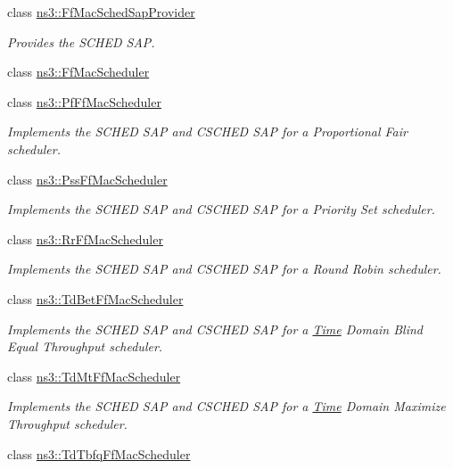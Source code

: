 \begin{DoxyCompactItemize}
class \hyperlink{classns3_1_1FfMacSchedSapProvider}{ns3\+::\+Ff\+Mac\+Sched\+Sap\+Provider}
\begin{DoxyCompactList}\small\item\em Provides the S\+C\+H\+ED S\+AP. \end{DoxyCompactList}\item 
class \hyperlink{classns3_1_1FfMacScheduler}{ns3\+::\+Ff\+Mac\+Scheduler}
\item 
class \hyperlink{classns3_1_1PfFfMacScheduler}{ns3\+::\+Pf\+Ff\+Mac\+Scheduler}
\begin{DoxyCompactList}\small\item\em Implements the S\+C\+H\+ED S\+AP and C\+S\+C\+H\+ED S\+AP for a Proportional Fair scheduler. \end{DoxyCompactList}\item 
class \hyperlink{classns3_1_1PssFfMacScheduler}{ns3\+::\+Pss\+Ff\+Mac\+Scheduler}
\begin{DoxyCompactList}\small\item\em Implements the S\+C\+H\+ED S\+AP and C\+S\+C\+H\+ED S\+AP for a Priority Set scheduler. \end{DoxyCompactList}\item 
class \hyperlink{classns3_1_1RrFfMacScheduler}{ns3\+::\+Rr\+Ff\+Mac\+Scheduler}
\begin{DoxyCompactList}\small\item\em Implements the S\+C\+H\+ED S\+AP and C\+S\+C\+H\+ED S\+AP for a Round Robin scheduler. \end{DoxyCompactList}\item 
class \hyperlink{classns3_1_1TdBetFfMacScheduler}{ns3\+::\+Td\+Bet\+Ff\+Mac\+Scheduler}
\begin{DoxyCompactList}\small\item\em Implements the S\+C\+H\+ED S\+AP and C\+S\+C\+H\+ED S\+AP for a \hyperlink{classns3_1_1Time}{Time} Domain Blind Equal Throughput scheduler. \end{DoxyCompactList}\item 
class \hyperlink{classns3_1_1TdMtFfMacScheduler}{ns3\+::\+Td\+Mt\+Ff\+Mac\+Scheduler}
\begin{DoxyCompactList}\small\item\em Implements the S\+C\+H\+ED S\+AP and C\+S\+C\+H\+ED S\+AP for a \hyperlink{classns3_1_1Time}{Time} Domain Maximize Throughput scheduler. \end{DoxyCompactList}\item 
class \hyperlink{classns3_1_1TdTbfqFfMacScheduler}{ns3\+::\+Td\+Tbfq\+Ff\+Mac\+Scheduler}

\end{DoxyCompactItemize}
